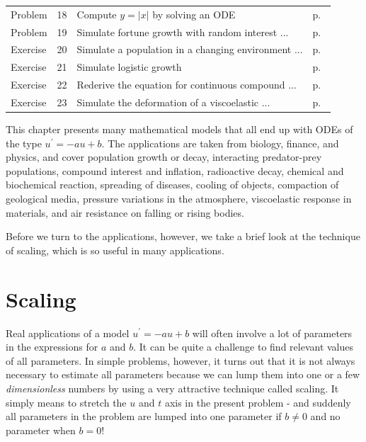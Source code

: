 \documentclass[%
oneside,                 %
final,                   %
10pt]{article}
\begin{document}
\begin{tabular}{lrll}
Problem & 18 & Compute $y=|x|$ by solving an ODE & p.~\pageref{decay:app:exer:signum} \\
Problem & 19 & Simulate fortune growth with random interest ... & p.~\pageref{decay:app:exer:interest} \\
Exercise & 20 & Simulate a population in a changing environment ... & p.~\pageref{decay:app:exer:pop:at} \\
Exercise & 21 & Simulate logistic growth & p.~\pageref{decay:app:exer:pop:logistic1} \\
Exercise & 22 & Rederive the equation for continuous compound ... & p.~\pageref{decay:app:exer:interest:derive} \\
Exercise & 23 & Simulate the deformation of a viscoelastic ... & p.~\pageref{decay:app:exer:viscoelasticity1} \\
\end{tabular}
\clearpage %




\vspace{1cm} %







This chapter presents many mathematical models that all end up with
ODEs of the type $u^{\prime}=-au+b$.  The applications are taken from
biology, finance, and physics, and cover population growth or decay,
interacting predator-prey populations, compound interest and
inflation, radioactive decay, chemical and biochemical reaction,
spreading of diseases, cooling of objects, compaction of geological
media, pressure variations in the atmosphere, viscoelastic response in
materials, and air resistance on falling or rising bodies.

Before we turn to the applications, however, we take a brief look at
the technique of scaling, which is so useful in many applications.


\section{Scaling}
\label{decay:app:scaling}

Real applications of a model $u^{\prime}=-au+b$ will often involve a lot
of parameters in the expressions for $a$ and $b$. It can be quite
a challenge to find relevant values of all parameters. In simple
problems, however, it turns out that it is not always necessary
to estimate all parameters because we can lump them into one or
a few \emph{dimensionless} numbers by using a very attractive technique
called scaling. It simply means to stretch the $u$ and $t$ axis
in the present problem - and suddenly all parameters in the problem
are lumped into one parameter if $b\neq 0$ and no parameter when $b=0$!
\end{document}
